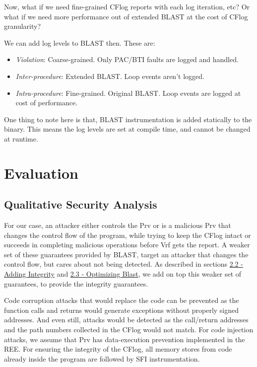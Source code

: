 \documentclass[a4paper, nobind]{templates/ociamthesis}
\providecommand{\tightlist}{%
  \setlength{\itemsep}{0pt}\setlength{\parskip}{0pt}}
\begin{document}
Now, what if we need fine-grained CFlog reports with each log iteration, etc?
Or what if we need more performance out of extended BLAST at the cost of CFlog granularity?

We can add log levels to BLAST then. These are:

\begin{itemize}
\tightlist
\item
  \emph{Violation}: Coarse-grained. Only PAC/BTI faults are logged and handled.
\item
  \emph{Inter-procedure}: Extended BLAST. Loop events aren't logged.
\item
  \emph{Intra-procedure}: Fine-grained. Original BLAST. Loop events are logged at cost of performance.
\end{itemize}

One thing to note here is that, BLAST instrumentation is added statically to the binary.
This means the log levels are set at compile time, and cannot be changed at runtime.

\chapter{Evaluation}\label{evaluation}

\minitoc 

\section{Qualitative Security Analysis}\label{qualitative-security-analysis}

For our case, an attacker either controls the Prv or is a malicious Prv that changes
the control flow of the program, while trying to keep the CFlog intact
or succeeds in completing malicious operations before Vrf gets the report.
A weaker set of these guarantees provided by BLAST, target an attacker that changes the control flow,
but cares about not being detected.
As described in sections \hyperref[adding-integrity]{2.2 - Adding Integrity} and
\hyperref[optimizing-blast]{2.3 - Optimizing Blast}, we add on top this weaker set of guarantees,
to provide the integrity guarantees.

Code corruption attacks that would replace the code can be prevented
as the function calls and returns would generate exceptions without properly signed
addresses. And even still, attacks would be detected as the call/return addresses and
the path numbers collected in the CFlog would not match. For code injection attacks,
we assume that Prv has data-execution prevention implemented in the REE.
For ensuring the integrity of the CFlog, all memory stores from code already inside the
program are followed by SFI instrumentation.
\end{document}
